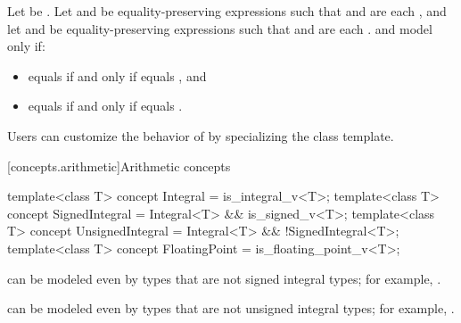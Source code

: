 \begin{itemdescr}
\pnum
Let  be .
Let  and  be
equality-preserving expressions such that
 and  are each , and
let  and  be equality-preserving expressions such that
 and  are each .
 and  model 
only if:
\begin{itemize}
\item {} equals  if and only if
   equals , and
\item {} equals  if and only if
   equals .
\end{itemize}

\pnum
\begin{note}
Users can customize the behavior of  by specializing the
 class template.
\end{note}

\end{itemdescr}

[concepts.arithmetic]{Arithmetic concepts}

%
%
%
\begin{itemdecl}
template<class T>
  concept Integral = is_integral_v<T>;
template<class T>
  concept SignedIntegral = Integral<T> && is_signed_v<T>;
template<class T>
  concept UnsignedIntegral = Integral<T> && !SignedIntegral<T>;
template<class T>
  concept FloatingPoint = is_floating_point_v<T>;
\end{itemdecl}

\begin{itemdescr}
\pnum
\begin{note}
 can be modeled even by types that are
not signed integral types; for example, .
\end{note}

\pnum
\begin{note}
 can be modeled even by types that are
not unsigned integral types; for example, .
\end{note}
\end{itemdescr}

